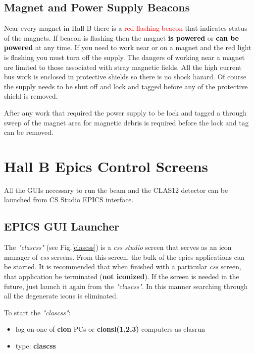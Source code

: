 \documentclass[12pt]{article}
\begin{document}
\subsection{Magnet and Power Supply Beacons}
\indent

Near every magnet in Hall B there is a \textcolor{red}{red flashing beacon} that indicates status of the magnets. If beacon is
flashing then the magnet \textbf{\textcolor{black}{is powered}} or \textbf{\textcolor{black}{can be powered}} at
any time. If you need to work near or on a magnet and the red light is flashing
you must turn off the supply. The dangers of working
near a magnet are limited to those associated with stray magnetic fields. All
the high current bus work is enclosed in protective shields so there is no shock
hazard. Of course the supply needs to be shut off and lock and tagged before
any of the protective shield is removed.

After any work that required the power supply to be lock and tagged a through
sweep of the magnet area for magnetic debris is required before the lock and
tag can be removed.


\section{Hall B Epics Control Screens}

All the GUIs necessary to run the beam and the CLAS12 detector can be launched from CS Studio EPICS interface. 

\subsection{EPICS GUI Launcher}
\indent

The \emph{"clascss"} (see Fig.\ref{clascss}) is a \emph{css studio} screen that serves as an icon manager of
\emph{css} screens. From this screen, the bulk of the epics applications can
be started. It is recommended that when finished with a particular \emph{css}
screen, that application be terminated (\textbf{not iconized}). If the screen
is needed in the future, just launch it again from the \emph{"clascss"}. In this
manner searching through all the degenerate icons is eliminated. 

To start the \emph{"clascss"}:

\begin{itemize}
\item log on one of  \textbf{clon} PCs or \textbf{clonsl(1,2,3)} computers as clasrun
\item type: \textbf{clascss}
\end{itemize}
\end{document}
